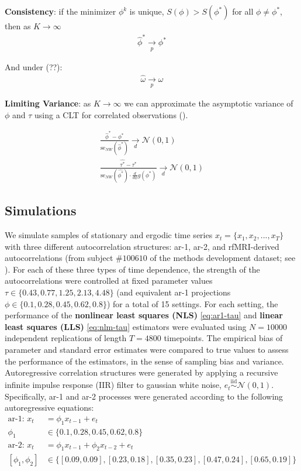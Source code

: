 \documentclass[main.tex]{subfiles}
\begin{document}
\textbf{Consistency}: if the minimizer $\phi^k$ is unique, $S(\phi) > S(\phi^*)$ for all $\phi \ne \phi^*$, then as $K\to\infty$
\begin{align}
\hat \phi^* \underset{p}{\to} \phi^*
\end{align}

And under (??):\\
\begin{align}
\hat \omega \underset{p}{\to} \omega
\end{align}

\textbf{Limiting Variance}: as $K\to\infty$ we can approximate the asymptotic variance of $\phi$ and $\tau$ using a CLT for correlated observations (\cite{hansen_econometrics_2022}).

\begin{align}
\frac{\hat\phi^* - \phi^*}{\text{se}_{NW}(\hat\phi^*)} \underset{d}{\to} \mathcal{N}(0, 1)\\
\frac{\hat{\tau^*} - \tau^*}{\text{se}_{NW}(\hat{\phi^*}) \cdot \frac{d}{d\phi}g(\phi^*)} \underset{d}{\to} \mathcal{N}(0,1)
\end{align}

\subsection{Simulations}\label{sec:simulations}
 
We simulate samples of stationary and ergodic time series $x_t = \{x_1, x_2, ..., x_T\}$ with three different autocorrelation structures: ar-1, ar-2, and rfMRI-derived autocorrelations (from subject $\#100610$ of the methods development dataset; see ). For each of these three types of time dependence, the strength of the autocorrelations were controlled at fixed parameter values $\tau \in \{0.43, 0.77, 1.25, 2.13, 4.48\}$ (and equivalent ar-1 projections $\phi \in \{0.1, 0.28, 0.45, 0.62, 0.8\}$) for a total of 15 settings. For each setting, the performance of the \textbf{nonlinear least squares (NLS)} \eqref{eq:ar1-tau} and \textbf{linear least squares (LLS)} \eqref{eq:nlm-tau} estimators were evaluated using $N = 10000$ independent replications of length $T=4800$ timepoints. The empirical bias of parameter and standard error estimates were compared to true values to assess the performance of the estimators, in the sense of sampling bias and variance. \\

Autoregressive correlation structures were generated by applying a recursive infinite impulse response (IIR) filter to gaussian white noise, $e_t \overset{\text{iid}}{\sim} \mathcal{N}(0, 1)$. Specifically, ar-1 and ar-2 processes were generated according to the following autoregressive equations:
\begin{align*}
    \text{ar-1: }x_t &= \phi_1 x_{t-1} + e_t\\ 
    \phi_1 &\in \{0.1, 0.28, 0.45, 0.62, 0.8\}\\
    \text{ar-2: }x_t &= \phi_1 x_{t-1} + \phi_2 x_{t-2} + e_t\\
    [\phi_1, \phi_2] &\in \{[0.09, 0.09], [0.23, 0.18], [0.35, 0.23], [0.47, 0.24], [0.65, 0.19]\}
\end{align*}
\end{document}
